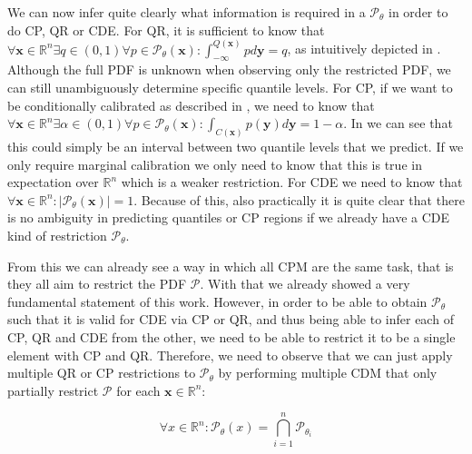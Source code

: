 We can now infer quite clearly what information is required in a $\mathscr{P}_{\theta}$ in order to do CP, QR or CDE. For QR, it is sufficient to know that
$\forall \mathbf{x} \in \mathbb{R}^n \exists q \in (0,1) \forall p\in \mathscr{P}_{\theta}(\mathbf{x}): \int_{-\infty}^{Q(\mathbf{x})} p d\mathbf{y} = q$, as intuitively depicted in . Although the full PDF is unknown when observing only the restricted PDF, we can still unambiguously determine specific quantile levels. For CP, if we want to be conditionally calibrated as described in , we need to know that $\forall \mathbf{x} \in \mathbb{R}^n \exists \alpha \in (0,1) \forall p\in \mathscr{P}_{\theta}(\mathbf{x}): \int_{C(\mathbf{x})} p(\mathbf{y}) d\mathbf{y} = 1 - \alpha$. In  we can see that this could simply be an interval between two quantile levels that we predict. If we only require marginal calibration we only need to know that this is true in expectation over $\mathbb{R}^n$ which is a weaker restriction. For CDE we need to know that $\forall \mathbf{x} \in \mathbb{R}^n: |\mathscr{P}_{\theta}(\mathbf{x})| = 1$. Because of this, also practically it is quite clear that there is no ambiguity in predicting quantiles or CP regions if we already have a CDE kind of restriction $\mathscr{P}_\theta$.

From this we can already see a way in which all CPM are the same task, that is they all aim to restrict the PDF $\mathcal{P}$. With that we already showed a very fundamental statement of this work. However, in order to be able to obtain $\mathscr{P}_\theta$ such that it is valid for CDE via CP or QR, and thus being able to infer each of CP, QR and CDE from the other, we need to be able to restrict it to be a single element with CP and QR. Therefore, we need to observe that we can just apply multiple QR or CP restrictions to $\mathscr{P}_\theta$ by performing multiple CDM that only partially restrict $\mathcal{P}$ for each $\mathbf{x}\in\mathbb{R}^n$:

\begin{equation}
    \forall x\in\mathbb{R}^n: \mathscr{P}_{\theta}(x) = \bigcap_{i=1}^n \mathscr{P}_{\theta_i}
\end{equation}

